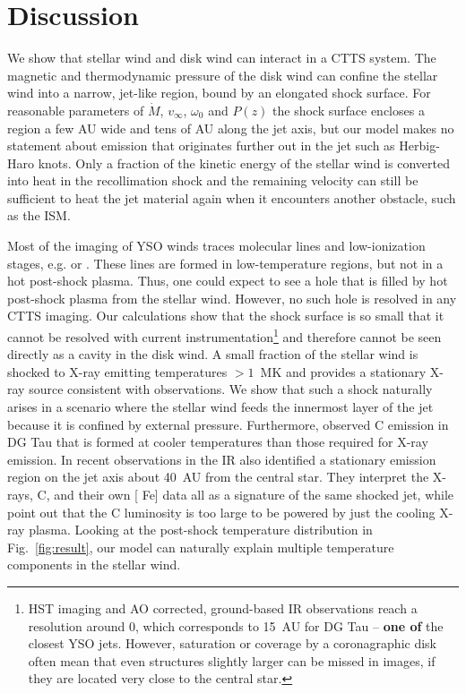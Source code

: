 \section{Discussion}
\label{sect:discussion}
We show that stellar wind and disk wind can interact in a CTTS system. The magnetic and thermodynamic pressure of the disk wind can confine the stellar wind into a narrow, jet-like region, bound by an elongated shock surface. For reasonable parameters of $\dot M$, $v_\infty$, $\omega_0$ and $P(z)$ the shock surface encloses a region a few AU wide and tens of AU along the jet axis, but our model makes no statement about emission that originates further out in the jet such as Herbig-Haro knots. Only a fraction of the kinetic energy of the stellar wind is converted into heat in the recollimation shock and the remaining velocity can still be sufficient to heat the jet material again when it encounters another obstacle, such as the ISM.

Most of the imaging of YSO winds traces molecular lines and low-ionization stages, e.g.  or . These lines are formed in low-temperature regions, but not in a hot post-shock plasma. Thus, one could expect to see a hole that is filled by hot post-shock plasma from the stellar wind. However, no such hole is resolved in any CTTS imaging. Our calculations show that the shock surface is so small that it cannot be resolved with current instrumentation\footnote{HST imaging and AO corrected, ground-based IR observations reach a resolution around 0, which corresponds to 15~AU for DG Tau -- \textbf{one of }the closest YSO jets. However, saturation or coverage by a coronagraphic disk often mean that even structures slightly larger can be missed in images, if they are located very close to the central star.} and therefore cannot be seen directly as a cavity in the disk wind. A small fraction of the stellar wind is shocked to X-ray emitting temperatures $>1$~MK and provides a stationary X-ray source consistent with observations. 
We show that such a shock naturally arises in a scenario where the stellar wind feeds the innermost layer of the jet because it is confined by external pressure.
Furthermore, \citet{2013A&A...550L...1S} observed C emission in DG Tau that is formed at cooler temperatures than those required for X-ray emission. In recent observations in the IR \citet{2014arXiv1404.0728W} also identified a stationary emission region on the jet axis about 40~AU from the central star. They interpret the X-rays,  C, and their own [ Fe] data all as a signature of the same shocked jet, while \citet{2013A&A...550L...1S} point out that the C luminosity is too large to be powered by just the cooling X-ray plasma. Looking at the post-shock temperature distribution in Fig.~\ref{fig:result}, our model can naturally explain multiple temperature components in the stellar wind.

